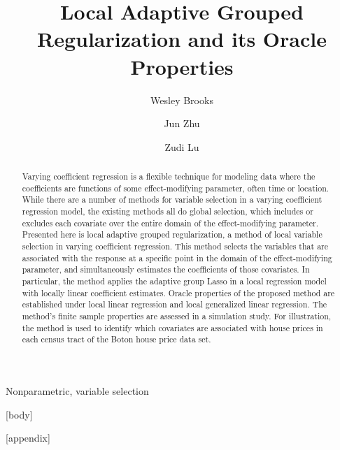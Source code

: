 \documentclass[authoryear,review, 12pt]{elsarticle}
\begin{document}
\begin{frontmatter}

\title{Local Adaptive Grouped Regularization and its Oracle Properties}


\author[wrbrooks]{Wesley Brooks}

\author[jzhu]{Jun Zhu}

\author[zlu]{Zudi Lu}

\address[wrbrooks]{Department of Statistics, University of Wisconsin, Madison, WI 53706}
\address[jzhu]{Department of Statistics and Department of Entomology, University of Wisconsin, Madison, WI 53706}
\address[zlu]{School of Mathematical Sciences, The University of Southampton Highfield, Southampton UK}

\begin{abstract}
Varying coefficient regression is a flexible technique for modeling data where the coefficients are functions of some effect-modifying parameter, often time or location. While there are a number of methods for variable selection in a varying coefficient regression model, the existing methods all do global selection, which includes or excludes each covariate over the entire domain of the effect-modifying parameter. Presented here is local adaptive grouped regularization, a method of local variable selection in varying coefficient regression. This method selects the variables that are associated with the response at a specific point in the domain of the effect-modifying parameter, and simultaneously estimates the coefficients of those covariates. In particular, the method applies the adaptive group Lasso in a local regression model with locally linear coefficient estimates. Oracle properties of the proposed method are established under local linear regression and local generalized linear regression. The method's finite sample properties are assessed in a simulation study. For illustration, the method is used to identify which covariates are associated with house prices in each census tract of the Boton house price data set.
\end{abstract}

\begin{keyword}
Nonparametric, variable selection
\end{keyword}

\end{frontmatter}

[body]




\clearpage
{}

[appendix]
\end{document}
